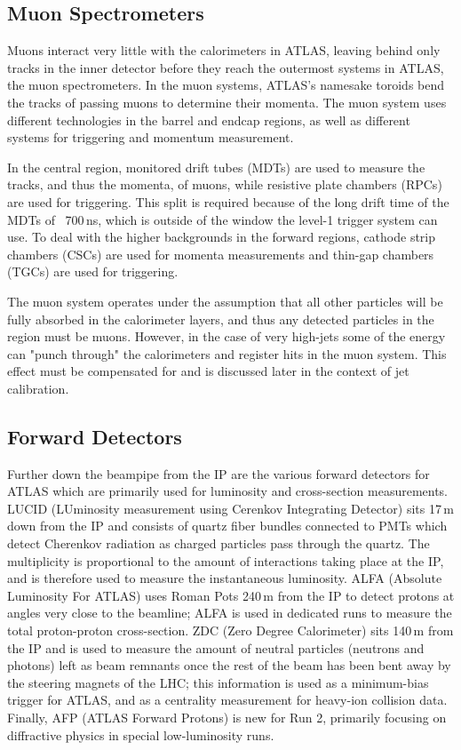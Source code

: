 \subsection{Muon Spectrometers}

Muons interact very little with the calorimeters in ATLAS, leaving behind only tracks in the inner detector before they reach the outermost systems in ATLAS, the muon spectrometers.  In the muon systems, ATLAS's namesake toroids bend the tracks of passing muons to determine their momenta.  The muon system uses different technologies in the barrel and endcap regions, as well as different systems for triggering and momentum measurement.

In the central region, monitored drift tubes (MDTs) are used to measure the tracks, and thus the momenta, of muons, while resistive plate chambers (RPCs) are used for triggering.  This split is required because of the long drift time of the MDTs of ~700\,ns, which is outside of the window the level-1 trigger system can use.  To deal with the higher backgrounds in the forward regions, cathode strip chambers (CSCs) are used for momenta measurements and thin-gap chambers (TGCs) are used for triggering.

The muon system operates under the assumption that all other particles will be fully absorbed in the calorimeter layers, and thus any detected particles in the region must be muons.  However, in the case of very high-\pt jets some of the energy can "punch through" the calorimeters and register hits in the muon system.  This effect must be compensated for and is discussed later in the context of jet calibration.

\subsection{Forward Detectors}

Further down the beampipe from the IP are the various forward detectors for ATLAS which are primarily used for luminosity and cross-section measurements.  LUCID (LUminosity measurement using Cerenkov Integrating Detector) sits 17\,m down from the IP and consists of quartz fiber bundles connected to PMTs which detect Cherenkov radiation as charged particles pass through the quartz.  The multiplicity is proportional to the amount of interactions taking place at the IP, and is therefore used to measure the instantaneous luminosity.  ALFA (Absolute Luminosity For ATLAS) uses Roman Pots 240\,m from the IP to detect protons at angles very close to the beamline; ALFA is used in dedicated runs to measure the total proton-proton cross-section.  ZDC (Zero Degree Calorimeter) sits 140\,m from the IP and is used to measure the amount of neutral particles (neutrons and photons) left as beam remnants once the rest of the beam has been bent away by the steering magnets of the LHC; this information is used as a minimum-bias trigger for ATLAS, and as a centrality measurement for heavy-ion collision data.  Finally, AFP (ATLAS Forward Protons) is new for Run 2, primarily focusing on diffractive physics in special low-luminosity runs.

